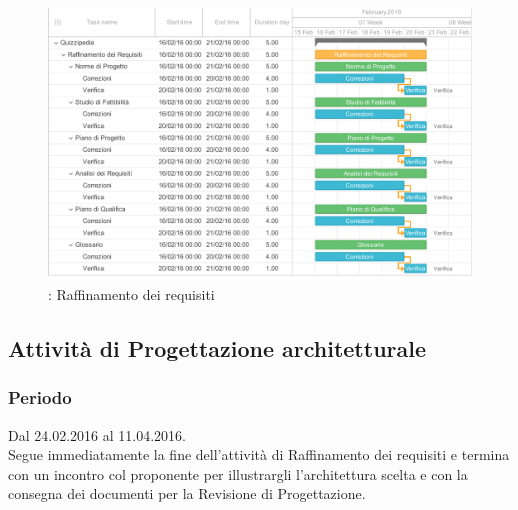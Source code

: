 \documentclass[a4paper, titlepage]{article}
\begin{document}
	\newpage
	\begin{figure}
		\includegraphics[scale=0.7]{Img/Grafici_Gantt/Raffinamento_requisiti.pdf}
		\caption{ : Raffinamento dei requisiti}
	\end{figure}
	
	\subsection{Attività di Progettazione architetturale}
	\subsubsection{Periodo}
	Dal 24.02.2016 al 11.04.2016.\\
	Segue immediatamente la fine dell'attività di Raffinamento dei requisiti  e termina con un incontro col proponente per illustrargli l'architettura scelta e con la consegna dei documenti per la Revisione di Progettazione.
	
\end{document}
